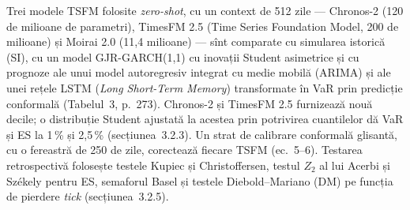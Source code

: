 \textbf{} %
{Trei modele TSFM folosite \emph{zero-shot}, cu un context de 512 zile --- Chronos-2 (120 de milioane de parametri), TimesFM 2.5 (Time Series Foundation Model, 200 de milioane) și Moirai 2.0 (11,4 milioane) --- sînt comparate cu simularea istorică (SI), cu un model GJR-GARCH(1,1) cu inovații Student asimetrice și cu prognoze ale unui model autoregresiv integrat cu medie mobilă (ARIMA) și ale unei rețele LSTM (\emph{Long Short-Term Memory}) transformate în VaR prin predicție conformală (Tabelul~3, p.~273).
Chronos-2 și TimesFM 2.5 furnizează nouă decile; o distribuție Student ajustată la acestea prin potrivirea cuantilelor dă VaR și ES la 1\,\% și 2,5\,\% (secțiunea~3.2.3). Un strat de calibrare conformală glisantă, cu o fereastră de 250 de zile, corectează fiecare TSFM (ec.~5--6). Testarea retrospectivă folosește testele Kupiec și Christoffersen, testul $Z_2$ al lui Acerbi și Székely pentru ES, semaforul Basel și testele Diebold--Mariano (DM) pe funcția de pierdere \emph{tick} (secțiunea~3.2.5).}


